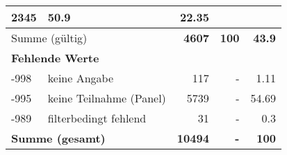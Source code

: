 \begin{longtable}{lXrrr}
       \num{2345} &
       \num[round-mode=places,round-precision=2]{50,9} &
         \num[round-mode=places,round-precision=2]{22,35} \\
     \midrule
     \multicolumn{2}{l}{Summe (gültig)} &
       \textbf{\num{4607}} &
     \textbf{100} &
       \textbf{\num[round-mode=places,round-precision=2]{43,9}} \\
     \multicolumn{5}{l}{\textbf{Fehlende Werte}}\\
       -998 &
       keine Angabe &
         \num{117} &
        - &
         \num[round-mode=places,round-precision=2]{1,11} \\
       -995 &
       keine Teilnahme (Panel) &
         \num{5739} &
        - &
         \num[round-mode=places,round-precision=2]{54,69} \\
       -989 &
       filterbedingt fehlend &
         \num{31} &
        - &
         \num[round-mode=places,round-precision=2]{0,3} \\
     \midrule
     \multicolumn{2}{l}{\textbf{Summe (gesamt)}} &
          \textbf{\num{10494}} &
        \textbf{-} &
        \textbf{100} \\
     \bottomrule
     \end{longtable}
     
